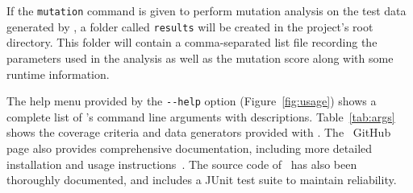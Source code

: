 

If the \lstinline{mutation} command is given to perform mutation analysis on the test data generated by
\sa, a folder called \lstinline{results} will be created in the project's root directory.
This folder will contain a comma-separated list file recording the parameters used in the analysis as well
as the mutation score along with some runtime information.

The help menu provided by the \lstinline{--help} option (Figure~\ref{fig:usage}) shows a complete list of \sa's command
line arguments with descriptions. Table~\ref{tab:args} shows the coverage criteria and data generators provided with
\sa. The \sa~GitHub page also provides comprehensive documentation, including more detailed installation and usage
instructions~\cite{tool}. The source code of \sa~has also been thoroughly documented, and includes a JUnit test suite to
maintain reliability.

